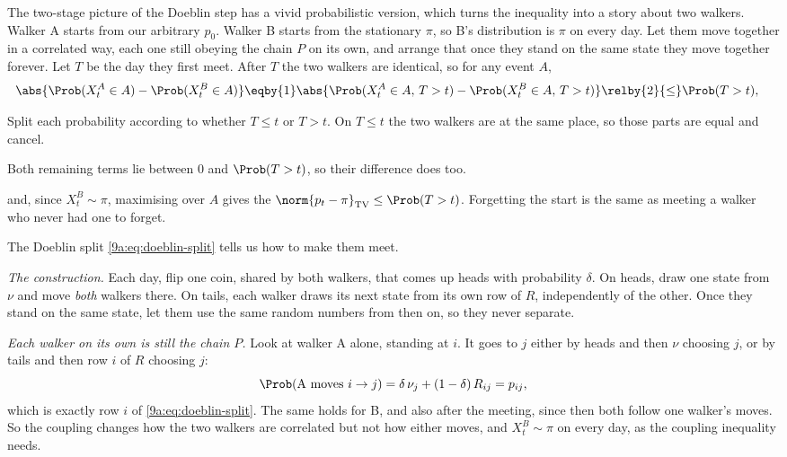 The two-stage picture of the Doeblin step has a vivid probabilistic version, which turns the
inequality into a story about two walkers. Walker A starts from our arbitrary $p_0$. Walker B
starts from the stationary $\pi$, so B's distribution is $\pi$ on every day. Let them move
together in a correlated way, each one still obeying the chain $P$ on its own, and arrange that
once they stand on the same state they move together forever. Let $T$ be the day they first
meet. After $T$ the two walkers are identical, so for any event $A$,
\begin{align}
  \abs{\Prob(X^A_t\in A)-\Prob(X^B_t\in A)}
  &\eqby{1}\abs{\Prob(X^A_t\in A,\,T>t)-\Prob(X^B_t\in A,\,T>t)}
   \relby{2}{\le}\Prob(T>t),
  \label{9a:eq:coupling}
\end{align}
\begin{explain}
  \item Split each probability according to whether $T\le t$ or $T>t$. On $T\le t$ the two
        walkers are at the same place, so those parts are equal and cancel.
  \item Both remaining terms lie between 0 and $\Prob(T>t)$, so their difference does too.
\end{explain}
and, since $X^B_t\sim\pi$, maximising over $A$ gives the 
$\norm{p_t-\pi}_{\rm TV}\le\Prob(T>t)$. Forgetting the start is the same as meeting a walker
who never had one to forget.

The Doeblin split \eqref{9a:eq:doeblin-split} tells us how to make them meet.

\emph{The construction.} Each day, flip one coin, shared by both walkers, that comes up heads
with probability $\delta$. On heads, draw one state from $\nu$ and move \emph{both} walkers
there. On tails, each walker draws its next state from its own row of $R$, independently of the
other. Once they stand on the same state, let them use the same random numbers from then on, so
they never separate.

\emph{Each walker on its own is still the chain $P$.} Look at walker A alone, standing at $i$.
It goes to $j$ either by heads and then $\nu$ choosing $j$, or by tails and then row $i$ of $R$
choosing $j$:
\begin{equation*}
  \Prob(\text{A moves }i\to j)=\delta\,\nu_j+(1-\delta)\,R_{ij}=p_{ij},
\end{equation*}
which is exactly row $i$ of \eqref{9a:eq:doeblin-split}. The same holds for B, and also after
the meeting, since then both follow one walker's moves. So the coupling changes how the two
walkers are correlated but not how either moves, and $X^B_t\sim\pi$ on every day, as the
coupling inequality needs.

